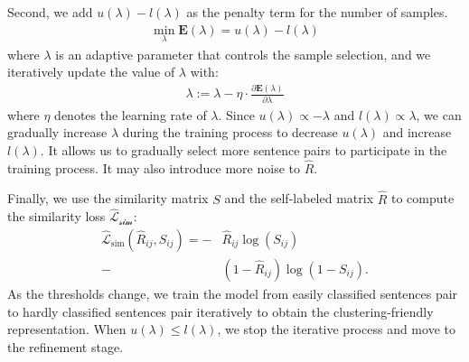 \documentclass[letterpaper]{article} \usepackage{aaai20}  \usepackage{times}  \usepackage{helvet} \usepackage{courier}  \usepackage[hyphens]{url}  \usepackage{graphicx} \urlstyle{rm} \def\UrlFont{\rm}  \usepackage{graphicx}  \frenchspacing  \setlength{\pdfpagewidth}{8.5in}  \setlength{\pdfpageheight}{11in}
\begin{document}
Second, we add $u(\lambda)-l(\lambda)$ as the penalty term for the number of samples. 
\begin{align}
    \min_\lambda \mathbf{E}(\lambda) = u(\lambda) - l(\lambda)
\end{align}
where $\lambda$ is an adaptive parameter that controls the sample selection, and we iteratively update the value of $\lambda$ with:
\begin{align}
    \lambda := \lambda - \eta \cdot \frac{\partial \mathbf{E}(\lambda)}{\partial \lambda}
\end{align}
where $\eta$ denotes the learning rate of $\lambda$. Since $u(\lambda) \propto -\lambda$ and $l(\lambda) \propto \lambda$, we can gradually increase $\lambda$ during the training process to decrease $u(\lambda)$ and increase $l(\lambda)$. It allows us to gradually select more sentence pairs to participate in the training process. It may also introduce more noise to $\hat R$.

Finally, we use the similarity matrix $S$ and the self-labeled matrix $\hat R$ to compute the similarity loss  $\mathcal{\hat L_{\text{sim}}}$: 
\begin{equation}
\begin{aligned}
    \mathcal{\hat L}_{\text{sim}}(\hat R_{ij}, S_{ij}  ) = -& \hat R_{ij} \log(S_{ij}) \\
     - &(1- \hat R_{ij}) \log(1-S_{ij}).
\end{aligned}
\end{equation}
As the thresholds change, we train the model from easily classified sentences pair to hardly classified sentences pair iteratively to obtain the clustering-friendly representation. When $u(\lambda) \leq l(\lambda)$, we stop the iterative process and move to the refinement stage. 
\end{document}
